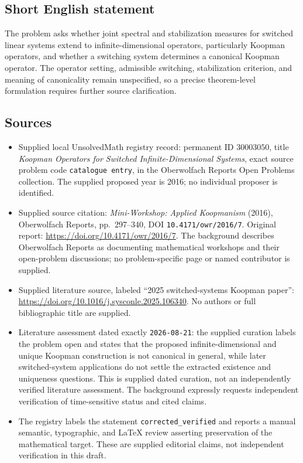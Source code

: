 \documentclass[11pt]{article}
\begin{document}
\subsection{Short English statement}
The problem asks whether joint spectral and stabilization measures for switched linear systems extend to infinite-dimensional operators, particularly Koopman operators, and whether a switching system determines a canonical Koopman operator. The operator setting, admissible switching, stabilization criterion, and meaning of canonicality remain unspecified, so a precise theorem-level formulation requires further source clarification.
\subsection{Sources}
\begin{itemize}
\item Supplied local UnsolvedMath registry record: permanent ID \(30003050\), title \emph{Koopman Operators for Switched Infinite-Dimensional Systems}, exact source problem code \texttt{catalogue entry}, in the Oberwolfach Reports Open Problems collection. The supplied proposed year is 2016; no individual proposer is identified.
\item Supplied source citation: \emph{Mini-Workshop: Applied Koopmanism} (2016), Oberwolfach Reports, pp.\ 297--340, DOI \texttt{10.4171/owr/2016/7}. Original report: \url{https://doi.org/10.4171/owr/2016/7}. The background describes Oberwolfach Reports as documenting mathematical workshops and their open-problem discussions; no problem-specific page or named contributor is supplied.
\item Supplied literature source, labeled ``2025 switched-systems Koopman paper'': \url{https://doi.org/10.1016/j.sysconle.2025.106340}. No authors or full bibliographic title are supplied.
\item Literature assessment dated exactly \texttt{2026-08-21}: the supplied curation labels the problem open and states that the proposed infinite-dimensional and unique Koopman construction is not canonical in general, while later switched-system applications do not settle the extracted existence and uniqueness questions. This is supplied dated curation, not an independently verified literature assessment. The background expressly requests independent verification of time-sensitive status and cited claims.
\item The registry labels the statement \texttt{corrected\_verified} and reports a manual semantic, typographic, and LaTeX review asserting preservation of the mathematical target. These are supplied editorial claims, not independent verification in this draft.
\end{itemize}
\end{document}
